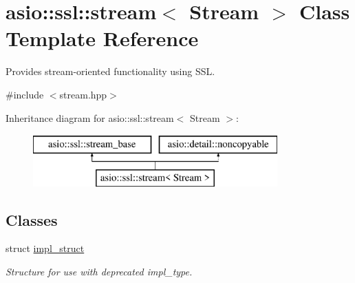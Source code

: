 \hypertarget{classasio_1_1ssl_1_1stream}{}\section{asio\+:\+:ssl\+:\+:stream$<$ Stream $>$ Class Template Reference}
\label{classasio_1_1ssl_1_1stream}


Provides stream-\/oriented functionality using S\+S\+L.  




{\ttfamily \#include $<$stream.\+hpp$>$}

Inheritance diagram for asio\+:\+:ssl\+:\+:stream$<$ Stream $>$\+:\begin{figure}[H]
\begin{center}
\leavevmode
\includegraphics[height=2.000000cm]{classasio_1_1ssl_1_1stream}
\end{center}
\end{figure}
\subsection*{Classes}
\begin{DoxyCompactItemize}
\item 
struct \hyperlink{structasio_1_1ssl_1_1stream_1_1impl__struct}{impl\+\_\+struct}
\begin{DoxyCompactList}\small\item\em Structure for use with deprecated impl\+\_\+type. \end{DoxyCompactList}\end{DoxyCompactItemize}
